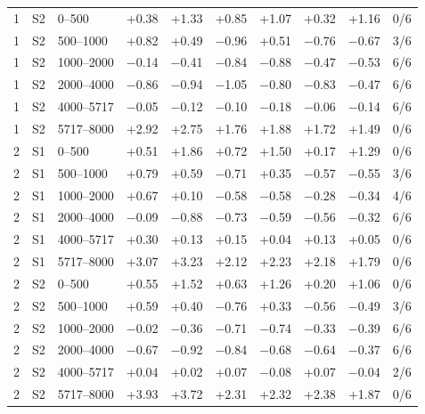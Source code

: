 \begin{longtable}{@{}lllrrrrrrr@{}}
1 & S2 & 0--500 & +0.38 & +1.33 & +0.85 & +1.07 & +0.32 & +1.16 & 0/6 \\
1 & S2 & 500--1000 & +0.82 & +0.49 & $-$0.96 & +0.51 & $-$0.76 & $-$0.67 & 3/6 \\
1 & S2 & 1000--2000 & $-$0.14 & $-$0.41 & $-$0.84 & $-$0.88 & $-$0.47 & $-$0.53 & 6/6 \\
1 & S2 & 2000--4000 & $-$0.86 & $-$0.94 & $-$1.05 & $-$0.80 & $-$0.83 & $-$0.47 & 6/6 \\
1 & S2 & 4000--5717 & $-$0.05 & $-$0.12 & $-$0.10 & $-$0.18 & $-$0.06 & $-$0.14 & 6/6 \\
1 & S2 & 5717--8000 & +2.92 & +2.75 & +1.76 & +1.88 & +1.72 & +1.49 & 0/6 \\
2 & S1 & 0--500 & +0.51 & +1.86 & +0.72 & +1.50 & +0.17 & +1.29 & 0/6 \\
2 & S1 & 500--1000 & +0.79 & +0.59 & $-$0.71 & +0.35 & $-$0.57 & $-$0.55 & 3/6 \\
2 & S1 & 1000--2000 & +0.67 & +0.10 & $-$0.58 & $-$0.58 & $-$0.28 & $-$0.34 & 4/6 \\
2 & S1 & 2000--4000 & $-$0.09 & $-$0.88 & $-$0.73 & $-$0.59 & $-$0.56 & $-$0.32 & 6/6 \\
2 & S1 & 4000--5717 & +0.30 & +0.13 & +0.15 & +0.04 & +0.13 & +0.05 & 0/6 \\
2 & S1 & 5717--8000 & +3.07 & +3.23 & +2.12 & +2.23 & +2.18 & +1.79 & 0/6 \\
2 & S2 & 0--500 & +0.55 & +1.52 & +0.63 & +1.26 & +0.20 & +1.06 & 0/6 \\
2 & S2 & 500--1000 & +0.59 & +0.40 & $-$0.76 & +0.33 & $-$0.56 & $-$0.49 & 3/6 \\
2 & S2 & 1000--2000 & $-$0.02 & $-$0.36 & $-$0.71 & $-$0.74 & $-$0.33 & $-$0.39 & 6/6 \\
2 & S2 & 2000--4000 & $-$0.67 & $-$0.92 & $-$0.84 & $-$0.68 & $-$0.64 & $-$0.37 & 6/6 \\
2 & S2 & 4000--5717 & +0.04 & +0.02 & +0.07 & $-$0.08 & +0.07 & $-$0.04 & 2/6 \\
2 & S2 & 5717--8000 & +3.93 & +3.72 & +2.31 & +2.32 & +2.38 & +1.87 & 0/6 \\
\bottomrule
\end{longtable}
